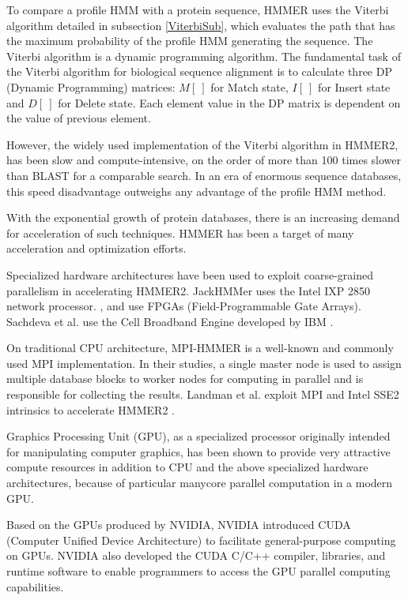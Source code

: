To compare a profile HMM with a protein sequence, HMMER uses the Viterbi algorithm detailed in subsection \ref{ViterbiSub}, which evaluates the path that has the maximum probability of the profile HMM generating the sequence. The Viterbi algorithm is a dynamic programming algorithm.
The fundamental task of the Viterbi algorithm for biological sequence alignment is to calculate three DP (Dynamic Programming) matrices: $M[~]$ for Match state, $I[~]$ for Insert state and $D[~]$ for Delete state. Each element value in the DP matrix is dependent on the value of previous element.

However, the widely used implementation of the Viterbi algorithm in HMMER2, has been slow and compute-intensive, on the order of more than 100 times slower than BLAST for a comparable search. In an era of enormous sequence databases, this speed disadvantage outweighs any advantage of the profile HMM method.

With the exponential growth of protein databases, there is an increasing demand for acceleration of such techniques. HMMER has been a target of many acceleration and optimization efforts. 

Specialized hardware architectures have been used to exploit coarse-grained parallelism in accelerating HMMER2. JackHMMer \citep{Wun} uses the Intel IXP 2850 network processor. \citep{Maddimsetty}, \citep{Derrien} and \citep{Oliver} use FPGAs (Field-Programmable Gate Arrays). Sachdeva et al. use the Cell Broadband Engine developed by IBM \citep{Sachdeva}.

On traditional CPU architecture, MPI-HMMER \citep{Walters2006} is a well-known and commonly used MPI implementation. In their studies, a single master node is used to assign multiple database blocks to worker nodes for computing in parallel and is responsible for collecting the results. Landman et al. exploit MPI and Intel SSE2 intrinsics to accelerate HMMER2 \citep{Landman}.

Graphics Processing Unit (GPU), as a specialized processor originally intended for manipulating computer graphics, has been shown to provide very attractive compute resources in addition to CPU and the above specialized hardware architectures, because of particular manycore parallel computation in a modern GPU.

Based on the GPUs produced by NVIDIA, NVIDIA introduced CUDA (Computer Unified Device Architecture) to facilitate general-purpose computing on GPUs. NVIDIA also developed the CUDA C/C++ compiler, libraries, and runtime software to enable programmers to access the GPU parallel computing capabilities.

